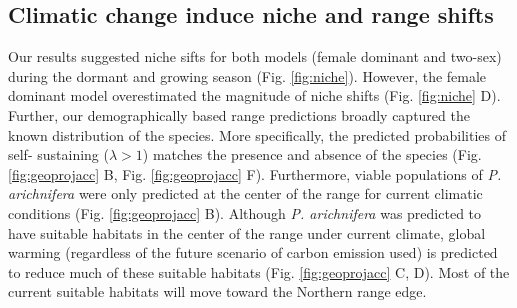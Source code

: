 \documentclass[12pt]{article}
\begin{document}
\subsection*{Climatic change induce niche and range shifts}
Our results suggested niche sifts for both models (female dominant and two-sex) during the dormant and growing season (Fig. \ref{fig:niche}). 
However, the female dominant model overestimated the magnitude of niche shifts (Fig. \ref{fig:niche} D). 
Further, our demographically based range predictions broadly captured the known distribution of the species. 
More specifically, the predicted probabilities of self- sustaining ($\lambda>1$) matches the presence and absence of the species (Fig. \ref{fig:geoprojacc} B, Fig. \ref{fig:geoprojacc} F). 
Furthermore, viable populations of \emph{P. arichnifera} were only predicted at the center of the range for current climatic conditions (Fig. \ref{fig:geoprojacc} B).
Although \emph{P. arichnifera} was predicted to have suitable habitats in the center of the range under current climate, global  warming (regardless of the future scenario of carbon emission used) is predicted to reduce much of these suitable habitats (Fig. \ref{fig:geoprojacc} C, D). 
Most of the current suitable habitats will move toward the Northern range edge.  
\end{document}
